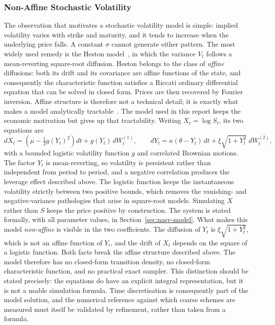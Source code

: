 \documentclass[11pt,a4paper]{article}
\theoremstyle{definition}
\theoremstyle{remark}
\begin{document}
\subsubsection{Non-Affine Stochastic Volatility}
\label{sec:non-affine}
The observation that motivates a stochastic volatility model is simple: implied volatility varies with strike and maturity, and it tends to increase when the underlying price falls. A constant $\sigma$ cannot generate either pattern. The most widely used remedy is the Heston model~\cite{heston}, in which the variance $V_t$ follows a mean-reverting square-root diffusion. Heston belongs to the class of \emph{affine} diffusions: both its drift and its covariance are affine functions of the state, and consequently the characteristic function satisfies a Riccati ordinary differential equation that can be solved in closed form. Prices are then recovered by Fourier inversion. Affine structure is therefore not a technical detail; it is exactly what makes a model analytically tractable~\cite{dfs}.
The model used in this report keeps the economic motivation but gives up that tractability. Writing $X_t = \log S_t$, its two equations are
$$
    dX_t = \left( \mu - \tfrac12 g(Y_t)^2 \right) dt + g(Y_t)\, dW_t^{(1)},
    \qquad
    dY_t = \kappa (\theta - Y_t)\, dt + \xi \sqrt{1 + Y_t^{2}}\; dW_t^{(2)},
$$
with a bounded logistic volatility function $g$ and correlated Brownian motions. The factor $Y_t$ is mean-reverting, so volatility is persistent rather than independent from period to period, and a negative correlation produces the leverage effect described above. The logistic function keeps the instantaneous volatility strictly between two positive bounds, which removes the vanishing- and negative-variance pathologies that arise in square-root models. Simulating $X$ rather than $S$ keeps the price positive by construction. The system is stated formally, with all parameter values, in Section~\ref{sec:nasv-model}.
What makes this model \emph{non-affine} is visible in the two coefficients. The diffusion of $Y_t$ is $\xi\sqrt{1 + Y_t^{2}}$, which is not an affine function of $Y_t$, and the drift of $X_t$ depends on the square of a logistic function. Both facts break the affine structure described above. The model therefore has no closed-form transition density, no closed-form characteristic function, and no practical exact sampler. This distinction should be stated precisely: the equations do have an explicit integral representation, but it is not a usable simulation formula. Time discretisation is consequently part of the model solution, and the numerical reference against which coarse schemes are measured must itself be validated by refinement, rather than taken from a formula.
\end{document}
